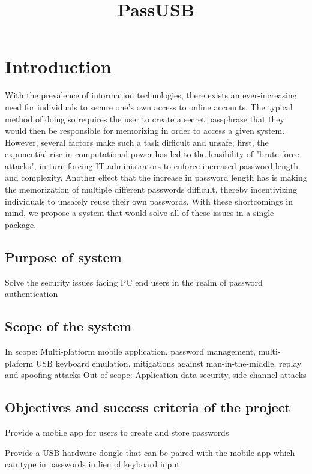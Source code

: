 \documentclass[stu]{apa7}
\title{PassUSB}
\begin{document}
\maketitle

\section{Introduction}

With the prevalence of information technologies, there exists an ever-increasing need for individuals to secure one's own access to online accounts. The typical method of doing so requires the user to create a secret passphrase that they would then be responsible for memorizing in order to access a given system. However, several factors make such a task difficult and unsafe; first, the exponential rise in computational power has led to the feasibility of "brute force attacks", in turn forcing IT administrators to enforce increased password length and complexity. Another effect that the increase in password length has is making the memorization of multiple different passwords difficult, thereby incentivizing individuals to unsafely reuse their own passwords. With these shortcomings in mind, we propose a system that would solve all of these issues in a single package.

\subsection{Purpose of system}
Solve the security issues facing PC end users in the realm of password authentication

\subsection{Scope of the system}
In scope: Multi-platform mobile application, password management, multi-plaform USB keyboard emulation, mitigations against man-in-the-middle, replay and spoofing attacks
Out of scope: Application data security, side-channel attacks

\subsection{Objectives and success criteria of the project}

\begin{APAitemize}
  \item Provide a mobile app for users to create and store passwords
  \item Provide a USB hardware dongle that can be paired with the mobile app which can type in passwords in lieu of keyboard input
\end{APAitemize}
\end{document}
